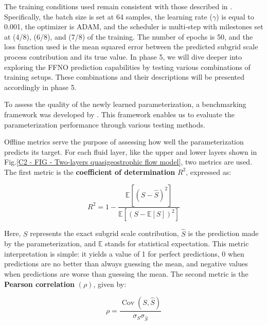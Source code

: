 The training conditions used remain consistent with those described in \cite{Benchmarking}. Specifically, the batch size is set at 64 samples, the learning rate ($\gamma$) is equal to 0.001, the optimizer is ADAM, and the scheduler is multi-step with milestones set at (4/8), (6/8), and (7/8) of the training. The number of epochs is 50, and the loss function used is the mean squared error between the predicted subgrid scale process contribution and its true value. In phase 5, we will dive deeper into exploring the FFNO prediction capabilities by testing various combinations of training setups. These combinations and their descriptions will be presented accordingly in phase 5.






\newpage


To assess the quality of the newly learned parameterization, a benchmarking framework was developed by \cite{Benchmarking}. This framework enables us to evaluate the parameterization performance through various testing methods.


Offline metrics serve the purpose of assessing how well the parameterization predicts its target. For each fluid layer, like the upper and lower layers shown in Fig.\ref{C2 - FIG - Two-layers quasigeostrophic flow model}, two metrics are used. The first metric is the \textbf{coefficient of determination} $R^2$, expressed as:

\vspace{0.3em}
\begin{equation}
R^2 = 1 - \frac{\mathbb{E}\left[(S - \hat{S})^2\right]}{\mathbb{E}\left[(S - \mathbb{E}[S])^2\right]}
\label{C5 - EQ - Coefficient of determination}
\end{equation}
\vspace{0.2em}

Here, $S$ represents the exact subgrid scale contribution, $\hat{S}$ is the prediction made by the parameterization, and $\mathbb{E}$ stands for statistical expectation. This metric interpretation is simple: it yields a value of 1 for perfect predictions, 0 when predictions are no better than always guessing the mean, and negative values when predictions are worse than guessing the mean. The second metric is the \textbf{Pearson correlation} $(\rho)$, given by:

\vspace{0.3em}
\begin{equation}
\rho = \frac{\operatorname{Cov}(S, \hat{S})}{\sigma_S \sigma_{\hat{S}}}
\label{C5 - EQ - Pearson}
\end{equation}
\vspace{0.2em}

